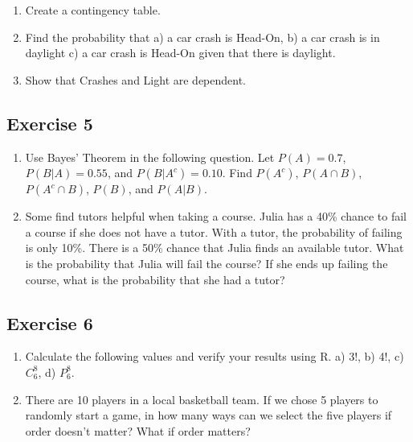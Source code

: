 \documentclass[
  letterpaper,
  DIV=11,
  numbers=noendperiod]{scrreprt}
\begin{document}
\begin{enumerate}
\def\labelenumi{\arabic{enumi}.}
\item
  Create a contingency table.
\item
  Find the probability that a) a car crash is Head-On, b) a car crash is
  in daylight c) a car crash is Head-On given that there is daylight.
\item
  Show that Crashes and Light are dependent.
\end{enumerate}

\hypertarget{exercise-5}{%
\subsection*{Exercise 5}\label{exercise-5}}

\begin{enumerate}
\def\labelenumi{\arabic{enumi}.}
\item
  Use Bayes' Theorem in the following question. Let \(P(A)=0.7\),
  \(P(B|A)=0.55\), and \(P(B|A^c)=0.10\). Find \(P(A^c)\),
  \(P(A \cap B)\), \(P(A^c \cap B)\), \(P(B)\), and \(P(A|B)\).
\item
  Some find tutors helpful when taking a course. Julia has a 40\% chance
  to fail a course if she does not have a tutor. With a tutor, the
  probability of failing is only 10\%. There is a 50\% chance that Julia
  finds an available tutor. What is the probability that Julia will fail
  the course? If she ends up failing the course, what is the probability
  that she had a tutor?
\end{enumerate}

\hypertarget{exercise-6}{%
\subsection*{Exercise 6}\label{exercise-6}}

\begin{enumerate}
\def\labelenumi{\arabic{enumi}.}
\item
  Calculate the following values and verify your results using R. a) 3!,
  b) 4!, c) \(C_6^8\), d) \(P_6^8\).
\item
  There are 10 players in a local basketball team. If we chose 5 players
  to randomly start a game, in how many ways can we select the five
  players if order doesn't matter? What if order matters?
\end{enumerate}
\end{document}

